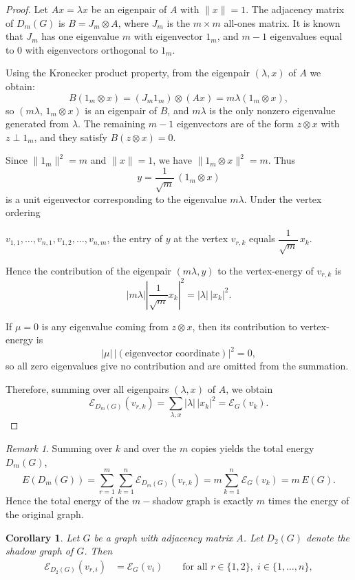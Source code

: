 \documentclass[12pt]{article}
\theoremstyle{plain}
\newtheorem*{corollary}{Corollary}
\theoremstyle{remark}
\newtheorem*{remark}{Remark}
\theoremstyle{definition}
\begin{document}
\begin{proof}
	Let $A x=\lambda x$ be an eigenpair of $A$ with $\|x\|=1$. The adjacency matrix of $D_m(G)$ is $B=J_m\otimes A$, where $J_m$ is the $m\times m$ all-ones matrix. It is known that $J_m$ has one eigenvalue $m$ with eigenvector $1_m$, and $m-1$ eigenvalues equal to $0$ with eigenvectors orthogonal to $1_m$.
	
	Using the Kronecker product property, from the eigenpair $(\lambda,x)$ of $A$ we obtain:
	\[
	B(1_m\otimes x) = (J_m 1_m)\otimes (Ax) = m\lambda (1_m\otimes x),
	\]
	so $(m\lambda,\,1_m\otimes x)$ is an eigenpair of $B$, and $m\lambda$ is the only nonzero eigenvalue generated from $\lambda$. The remaining $m-1$ eigenvectors are of the form $z\otimes x$ with $z\perp 1_m$, and they satisfy $B(z\otimes x)=0$.
	
	Since $\|1_m\|^2=m$ and $\|x\|=1$, we have $\|1_m\otimes x\|^2=m$. Thus
	\[
	y=\frac{1}{\sqrt{m}}\,(1_m\otimes x)
	\]
	is a unit eigenvector corresponding to the eigenvalue $m\lambda$. Under the vertex ordering
	
	\noindent $v_{1,1},\dots,v_{n,1},v_{1,2},\dots,v_{n,m}$, the entry of $y$ at the vertex $v_{r,k}$ equals $\dfrac{1}{\sqrt{m}}\,x_k$.
	
	Hence the contribution of the eigenpair $(m\lambda,y)$ to the vertex-energy of $v_{r,k}$ is
	\[
	|m\lambda|\left|\frac{1}{\sqrt{m}}x_k\right|^2
	=|\lambda|\,|x_k|^2.
	\]
	
	If $\mu=0$ is any eigenvalue coming from $z\otimes x$, then its contribution to vertex-energy is
	\[
	|\mu|\,|(\text{eigenvector coordinate})|^2 = 0,
	\]
	so all zero eigenvalues give no contribution and are omitted from the summation.
	
	Therefore, summing over all eigenpairs $(\lambda,x)$ of $A$, we obtain
	\[
	\mathcal{E}_{D_m(G)}(v_{r,k})
	=\sum_{\lambda,x}|\lambda|\,|x_k|^2
	=\mathcal{E}_G(v_k).
	\]
	
\end{proof}

\begin{remark}
	Summing over $k$ and over the $m$ copies yields the total energy
	$D_m(G)$,
	\[
	E(D_m(G))
	=\sum_{r=1}^m \sum_{k=1}^n \mathcal{E}_{D_m(G)}(v_{r,k})
	=m \sum_{k=1}^n \mathcal{E}_G(v_k)
	=m\,E(G).
	\]
	Hence the total energy of the $m-$shadow graph is exactly $m$ times the energy of the original graph.	
\end{remark}
\begin{corollary}
	Let $G$ be a graph with adjacency matrix $A$. Let $D_2(G)$ denote the shadow graph of $G$.  Then
	\begin{align*}
		\mathcal{E}_{D_2(G)}(v_{r,i}) &= \mathcal{E}_G(v_i)\qquad\text{for all }r\in\{1,2\},\; i\in\{1,\dots,n\},
	\end{align*}
\end{corollary}
\end{document}

